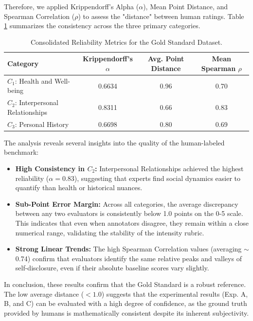 Therefore, we applied Krippendorff’s Alpha ($\alpha$), Mean Point Distance, and Spearman Correlation ($\rho$) to assess the "distance" between human ratings. Table \ref{tab:reliability_metrics} summarizes the consistency across the three primary categories.

\begin{table}[htbp]
\centering
\caption{Consolidated Reliability Metrics for the Gold Standard Dataset.}
\label{tab:reliability_metrics}
\begin{tabular}{@{}lccc@{}}
\toprule
\textbf{Category} & \textbf{Krippendorff's $\alpha$} & \textbf{Avg. Point Distance} & \textbf{Mean Spearman $\rho$} \\ \midrule
$C_1$: Health and Well-being & 0.6634 & 0.96 & 0.70 \\
$C_2$: Interpersonal Relationships & 0.8311 & 0.66 & 0.83 \\
$C_3$: Personal History & 0.6698 & 0.80 & 0.69 \\ \bottomrule
\end{tabular}
\end{table}

The analysis reveals several insights into the quality of the human-labeled benchmark:

\begin{itemize}
    \item \textbf{High Consistency in $C_2$:} Interpersonal Relationships achieved the highest reliability ($\alpha = 0.83$), suggesting that experts find social dynamics easier to quantify than health or historical nuances.
    \item \textbf{Sub-Point Error Margin:} Across all categories, the average discrepancy between any two evaluators is consistently below 1.0 points on the 0-5 scale. This indicates that even when annotators disagree, they remain within a close numerical range, validating the stability of the intensity rubric.
    \item \textbf{Strong Linear Trends:} The high Spearman Correlation values (averaging $\sim$0.74) confirm that evaluators identify the same relative peaks and valleys of self-disclosure, even if their absolute baseline scores vary slightly.
\end{itemize}

In conclusion, these results confirm that the Gold Standard is a robust reference. The low average distance ($< 1.0$) suggests that the experimental results (Exp. A, B, and C) can be evaluated with a high degree of confidence, as the ground truth provided by humans is mathematically consistent despite its inherent subjectivity.



